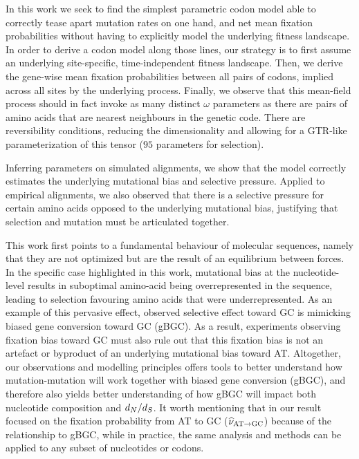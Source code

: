 In this work we seek to find the simplest parametric codon model able to correctly tease apart mutation rates on one hand, and net mean fixation probabilities without having to explicitly model the underlying fitness landscape.
In order to derive a codon model along those lines, our strategy is to first assume an underlying site-specific, time-independent fitness landscape.
Then, we derive the gene-wise mean fixation probabilities between all pairs of codons, implied across all sites by the underlying process.
Finally, we observe that this mean-field process should in fact invoke as many distinct $\omega$ parameters as there are pairs of amino acids that are nearest neighbours in the genetic code.
There are reversibility conditions, reducing the dimensionality and allowing for a GTR-like parameterization of this tensor ($95$ parameters for selection).

Inferring parameters on simulated alignments, we show that the model correctly estimates the underlying mutational bias and selective pressure.
Applied to empirical alignments, we also observed that there is a selective pressure for certain amino acids opposed to the underlying mutational bias, justifying that selection and mutation must be articulated together.

This work first points to a fundamental behaviour of molecular sequences, namely that they are not optimized but are the result of an equilibrium between forces.
In the specific case highlighted in this work, mutational bias at the nucleotide-level results in suboptimal amino-acid being overrepresented in the sequence, leading to selection favouring amino acids that were underrepresented.
As an example of this pervasive effect, observed selective effect toward GC is mimicking biased gene conversion toward GC (\acrshort{gBGC}).
As a result, experiments observing fixation bias toward GC must also rule out that this fixation bias is not an artefact or byproduct of an underlying mutational bias toward AT.
Altogether, our observations and modelling principles offers tools to better understand how mutation-mutation will work together with biased gene conversion (\acrshort{gBGC}), and therefore also yields better understanding of how \acrshort{gBGC} will impact both nucleotide composition and $d_N / d_S$.
It worth mentioning that in our result focused on the fixation probability from AT to GC ($\widehat{\nu}_{\text{AT} \rightarrow \text{GC}}$) because of the relationship to gBGC, while in practice, the same analysis and methods can be applied to any subset of nucleotides or codons.

